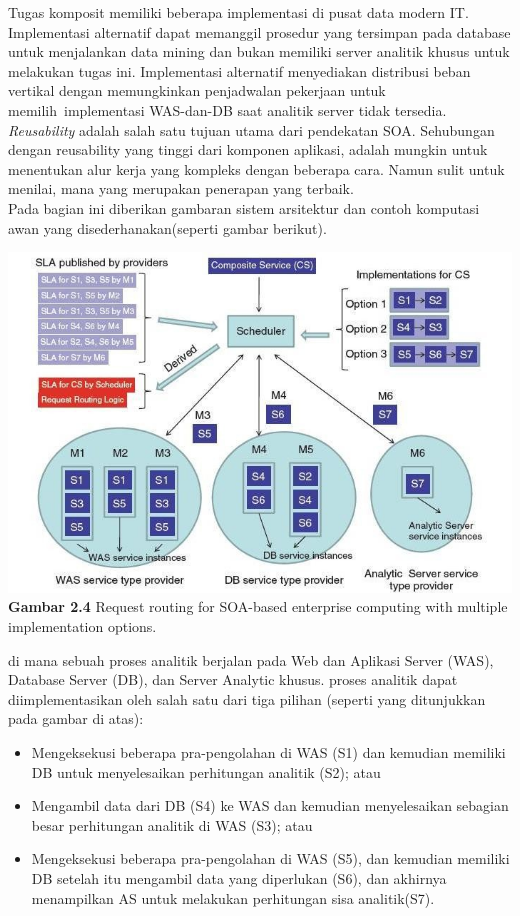 \tab Tugas komposit memiliki beberapa implementasi di pusat data modern IT. Implementasi alternatif dapat memanggil prosedur yang tersimpan pada database untuk menjalankan data mining dan bukan memiliki server analitik khusus untuk melakukan tugas ini. Implementasi alternatif menyediakan distribusi     beban vertikal dengan memungkinkan penjadwalan pekerjaan untuk memilih\ implementasi WAS-dan-DB saat analitik server tidak tersedia.\\
\textit{Reusability} adalah salah satu tujuan utama dari pendekatan SOA. Sehubungan dengan reusability yang tinggi dari komponen aplikasi, adalah mungkin untuk menentukan alur kerja yang kompleks dengan beberapa cara. Namun sulit untuk menilai, mana yang merupakan penerapan yang terbaik.\\
Pada bagian ini diberikan gambaran sistem arsitektur dan contoh komputasi awan yang disederhanakan(seperti  gambar berikut).\\
\begin{center}
\includegraphics[scale=1]{gambar24.jpg} \\
\textbf{Gambar  2.4} Request routing for SOA-based enterprise computing with multiple implementation options.
\end{center}
di mana sebuah proses analitik berjalan pada Web dan Aplikasi Server (WAS),  Database  Server (DB), dan Server Analytic khusus. proses analitik dapat diimplementasikan  oleh salah satu dari tiga pilihan (seperti yang ditunjukkan pada gambar di atas):
\begin{itemize}
\item Mengeksekusi beberapa pra-pengolahan di WAS (S1) dan kemudian memiliki DB untuk menyelesaikan perhitungan analitik (S2); atau
\item Mengambil data dari DB (S4) ke WAS dan kemudian menyelesaikan sebagian besar perhitungan analitik di WAS (S3); atau
\item Mengeksekusi  beberapa   pra-pengolahan   di  WAS   (S5),   dan   kemudian   memiliki DB setelah itu mengambil data yang diperlukan (S6), dan akhirnya menampilkan AS untuk   melakukan perhitungan sisa analitik(S7).
\end{itemize}
